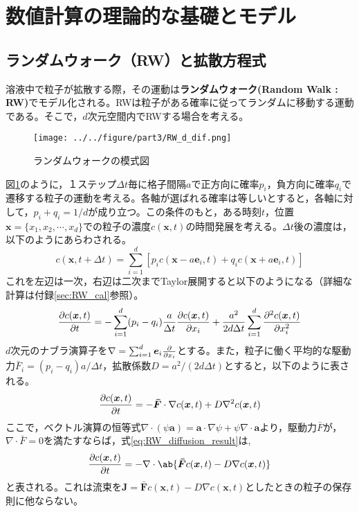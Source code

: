 \documentclass[autodetect-engine,dvi=dvipdfmx,a4paper,ja=standard,oneside,openany,11pt]{bxjsbook}
\begin{document}
\section{数値計算の理論的な基礎とモデル}
\subsection{ランダムウォーク（RW）と拡散方程式}
\label{sec:RW}
溶液中で粒子が拡散する際，その運動は\textbf{ランダムウォーク(Random Walk : RW)}でモデル化される。RWは粒子がある確率に従ってランダムに移動する運動である。そこで，$d$次元空間内でRWする場合を考える。
\begin{figure}[htbp]
  \centering
  \texttt{[image: ../../figure/part3/RW\_d\_dif.png]}
  \caption{ランダムウォークの模式図}
  \label{fig:random_walk}
\end{figure}
図\ref{fig:random_walk}のように，１ステップ$\Delta t$毎に格子間隔$a$で正方向に確率$p_i$，負方向に確率$q_i$で遷移する粒子の運動を考える。各軸が選ばれる確率は等しいとすると，各軸に対して，$p_i+q_i=1/d$が成り立つ。この条件のもと，ある時刻$t$，位置$\bm{x}=\{x_1,x_2,\cdots,x_d\}$での粒子の濃度$c(\bm{x},t)$の時間発展を考える。$\Delta t$後の濃度は，以下のようにあらわされる。
\begin{equation}
  c(\bm{x},t+\Delta t)=\sum_{i=1}^{d}\left[p_i c(\bm{x}-a\bm{e}_i,t)+q_i c(\bm{x}+a\bm{e}_i,t)\right]
  \label{eq:RW}
\end{equation}
これを左辺は一次，右辺は二次までTaylor展開すると以下のようになる（詳細な計算は付録\ref{sec:RW_cal}参照）。
\begin{equation}
  \pdv{c(\bm{x},t)}{t}=-\sum_{i=1}^{d}(p_i-q_i)\frac{a}{\Delta t}\pdv{c(\bm{x},t)}{x_i}+\frac{a^2}{2d\Delta t}\sum_{i=1}^{d}\pdv[2]{c(\bm{x},t)}{x_i}
  \label{eq:RW_diffusion}
\end{equation}
$d$次元のナブラ演算子を$\nabla=\sum_{i=1}^{d}\bm{e}_i\pdv*{}{x_i}$とする。また，粒子に働く平均的な駆動力$\bar{F}_i=(p_i-q_i)a/\Delta t$，拡散係数$D=a^2/(2d\Delta t)$とすると，以下のように表される。
\begin{equation}
  \pdv{c(\bm{x},t)}{t}=-\bm{\bar{F}}\cdot\nabla c(\bm{x},t)+D\nabla^2 c(\bm{x},t)
  \label{eq:RW_diffusion_result}
\end{equation}
ここで，ベクトル演算の恒等式$\nabla\cdot(\psi\bm{a})=\bm{a}\cdot\nabla\psi+\psi\nabla\cdot\bm{a}$より，駆動力$\bar{F}$が，$\nabla\cdot\bar{F}=0$を満たすならば，式\ref{eq:RW_diffusion_result}は,
\begin{equation}
  \pdv{c(\bm{x},t)}{t}=-\nabla\cdot\ab\{\bm{\bar{F}}c(\bm{x},t)-D\nabla c(\bm{x},t)\}
  \label{eq:RW_diffusion_result_divergence}
\end{equation}
と表される。これは流束を$\bm{J}=\bm{\bar{F}}c(\bm{x},t)-D\nabla c(\bm{x},t)$としたときの粒子の保存則に他ならない。
\end{document}
